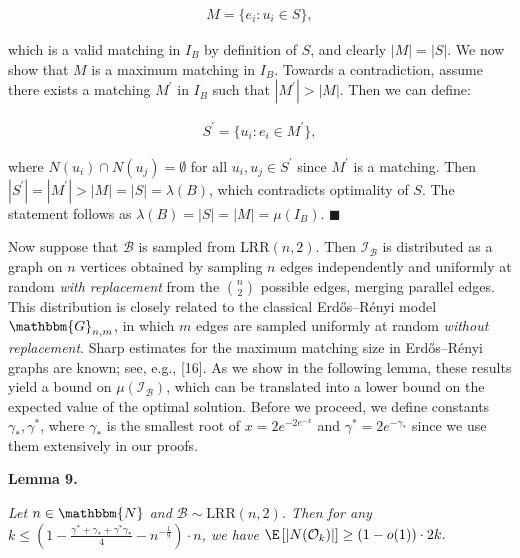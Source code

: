 \documentclass[10pt,a4paper]{article}
\begin{document}
\[\begin{gathered}
M=\{e_{i}:u_{i}\in S\},
\end{gathered}\]


which is a valid matching in $I_{B}$ by definition of $S$, and clearly $|M|=|S|$.
We now show that $M$ is a maximum matching in $I_{B}$.
Towards a contradiction, assume there exists a matching $M^{\prime}$ in $I_{B}$ such that $|M^{\prime}|>|M|$.
Then we can define:\par


\[\begin{gathered}
\displaystyle S^{\prime}=\{u_{i}:e_{i}\in M^{\prime}\},
\end{gathered}\]


where $N(u_{i})\cap N(u_{j})=\emptyset$ for all $u_{i},u_{j}\in S^{\prime}$ since $M^{\prime}$ is a matching.
Then $|S^{\prime}|=|M^{\prime}|>|M|=|S|=\lambda(B)$, which contradicts optimality of $S$.
The statement follows as $\lambda(B)=|S|=|M|=\mu(I_{B})$.
\ensuremath{\blacksquare}\par





Now suppose that $\mathcal{B}$ is sampled from $\text{{LRR}}(n,2)$. Then $\mathcal{I}_{\mathcal{B}}$ is distributed as a graph on $n$ vertices obtained by sampling $n$ edges independently and uniformly at random \emph{with replacement} from the $\binom{n}{2}$ possible edges, merging parallel edges. This distribution is closely related to the classical Erdős–Rényi model $\mathbbm{G}_{n,m}$, in which $m$ edges are sampled uniformly at random \emph{without replacement}. Sharp estimates for the maximum matching size in Erdős–Rényi graphs are known; see, e.g., [16].
As we show in the following lemma, these results yield a bound on $\mu(\mathcal{I}_{\mathcal{B}})$, which can be translated into a lower bound on the expected value of the optimal solution.
Before we proceed, we define constants $\gamma_{*},\gamma^{*}$, where $\gamma_{*}$ is the smallest root of $x=2e^{-2e^{-x}}$ and $\gamma^{*}=2e^{-\gamma_{*}}$ since we use them extensively in our proofs.\par





\par\medskip\noindent\textbf{\textbf{Lemma 9}\textbf{.}}\par



\emph{Let $n\in\mathbbm{N}$ and $\mathcal{B}\sim\text{{LRR}}\left(n,2\right)$.
Then for any $k\leq\left(1-\frac{\gamma^{*}+\gamma_{*}+\gamma^{*}\gamma_{*}}{4}-n^{-\frac{1}{9}}\right)\cdot n$, we have $\E\left[|N(\mathcal{O}_{k})|\right]\geq(1-o(1))\cdot 2k.$}\par
\end{document}
